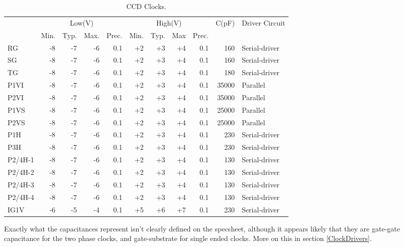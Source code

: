 \documentclass[a4paper,12pt]{article}
\begin{document}
\begin{table}[h]
\centering
\begin{tabular}{|l|rrrr|rrrr|r|l|}
\hline
&\multicolumn{4}{c|}{Low(V)}&\multicolumn{4}{c|}{High(V)}& C(pF)& Driver Circuit \\ 
&Min.&Typ.&Max.&Prec.&Min.&Typ.&Max&Prec.&& \\
\hline
RG & -8 & -7 & -6 & 0.1 & +2 & +3 & +4 & 0.1 & 160 & Serial-driver \\
SG & -8 & -7 & -6 & 0.1 & +2 & +3 & +4 & 0.1 & 160 & Serial-driver \\
TG & -8 & -7 & -6 & 0.1 & +2 & +3 & +4 & 0.1 & 180 & Serial-driver \\
P1VI & -8 & -7 & -6 & 0.1 & +2 & +3 & +4 & 0.1 & 35000 & Parallel \\
P2VI & -8 & -7 & -6 & 0.1 & +2 & +3 & +4 & 0.1 & 35000 & Parallel \\
P1VS & -8 & -7 & -6 & 0.1 & +2 & +3 & +4 & 0.1 & 25000 & Parallel \\
P2VS & -8 & -7 & -6 & 0.1 & +2 & +3 & +4 & 0.1 & 25000 & Parallel \\
P1H & -8 & -7 & -6 & 0.1 & +2 & +3 & +4 & 0.1 & 230 & Serial-driver \\
P3H & -8 & -7 & -6 & 0.1 & +2 & +3 & +4 & 0.1 & 230 & Serial-driver \\
P2/4H-1 & -8 & -7 & -6 & 0.1 & +2 & +3 & +4 & 0.1 & 130 & Serial-driver \\
P2/4H-2 & -8 & -7 & -6 & 0.1 & +2 & +3 & +4 & 0.1 & 130 & Serial-driver \\
P2/4H-3 & -8 & -7 & -6 & 0.1 & +2 & +3 & +4 & 0.1 & 130 & Serial-driver \\
P2/4H-4 & -8 & -7 & -6 & 0.1 & +2 & +3 & +4 & 0.1 & 130 & Serial-driver \\
IG1V & -6 & -5 & -4 & 0.1 & +5 & +6 & +7 & 0.1 &230 & Serial-driver \\
\hline
\end{tabular}
 \caption{CCD Clocks.}
 \label{Clocks}
\end{table}

Exactly what the capacitances represent isn't clearly defined on the specsheet, although it appears likely that they are gate-gate capacitance for the two phase clocks, and gate-substrate for single ended clocks. More on this in section \ref{ClockDrivers}.

\end{document}
